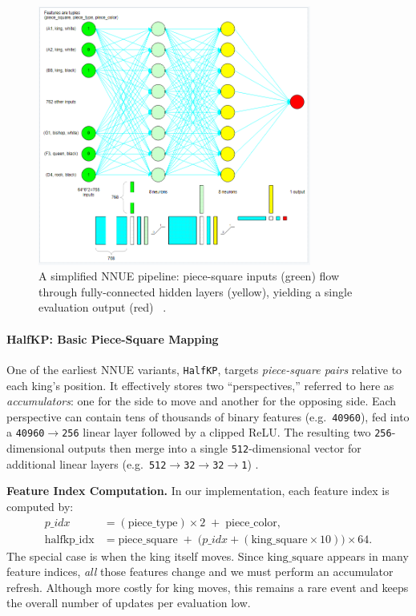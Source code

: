 \documentclass[12pt,a4paper]{article}
\begin{document}
\begin{figure}[H]
    \centering
    \includegraphics[width=0.8\textwidth]{figures/pipeline.png}
    \caption{A simplified NNUE pipeline: piece-square inputs (green) flow through 
    fully-connected hidden layers (yellow), yielding a single evaluation output (red) ~\cite{githubdocs}.}
    \label{fig:nnue_pipeline}
\end{figure}

\paragraph{HalfKP: Basic Piece-Square Mapping}
\label{sec:halfkp}

One of the earliest NNUE variants, \texttt{HalfKP}, targets \emph{piece-square pairs} relative to each king’s position. It effectively stores two “perspectives,” referred to here as \emph{accumulators}: one for the side to move and another for the opposing side. Each perspective can contain tens of thousands of binary features (e.g.\ \texttt{40960}), fed into a \texttt{40960$\to$256} linear layer followed by a clipped ReLU. The resulting two \texttt{256}-dimensional outputs then merge into a single \texttt{512}-dimensional vector for additional linear layers (e.g.\ \texttt{512$\to$32$\to$32$\to$1}) \cite{githubdocs}. 
\medskip

\noindent
\textbf{Feature Index Computation.} In our implementation, each feature index is computed by:
\[
\begin{aligned}
p\_idx &= (\text{piece\_type}) \times 2 \;+\; \text{piece\_color},\\
\text{halfkp\_idx} &= \text{piece\_square} 
    \;+\;
    \bigl(p\_idx + (\text{king\_square} \times 10)\bigr)\times 64.
\end{aligned}
\]
The special case is when the king itself moves. Since \(\text{king\_square}\) appears in many feature indices, \emph{all} those features change and we must perform an accumulator refresh. Although more costly for king moves, this remains a rare event and keeps the overall number of updates per evaluation low.
\end{document}
